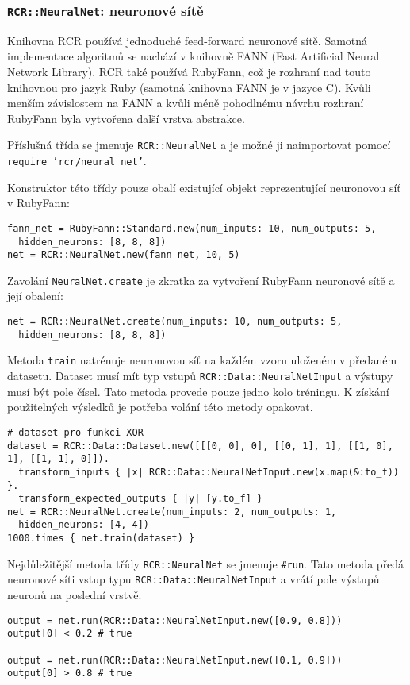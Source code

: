 \documentclass[a4paper]{article}
\begin{document}
\subsubsection{\texttt{RCR::NeuralNet}: neuronové sítě}
Knihovna RCR používá jednoduché feed-forward neuronové sítě. Samotná
implementace algoritmů se nachází v knihovně FANN (Fast Artificial Neural %
Network Library). RCR také používá RubyFann, což je rozhraní nad touto knihovnou
pro jazyk Ruby (samotná knihovna FANN je v jazyce C). Kvůli menším závislostem
na FANN a kvůli méně pohodlnému návrhu rozhraní RubyFann byla vytvořena další
vrstva abstrakce.

Příslušná třída se jmenuje \texttt{RCR::NeuralNet} a je možné ji naimportovat
pomocí \texttt{require 'rcr/neural\_net'}.

Konstruktor této třídy pouze obalí existující objekt reprezentující neuronovou
síť v RubyFann:
\begin{lstlisting}
fann_net = RubyFann::Standard.new(num_inputs: 10, num_outputs: 5,
  hidden_neurons: [8, 8, 8])
net = RCR::NeuralNet.new(fann_net, 10, 5)
\end{lstlisting}

Zavolání \texttt{NeuralNet.create} je zkratka za vytvoření RubyFann neuronové
sítě a její obalení:
\begin{lstlisting}
net = RCR::NeuralNet.create(num_inputs: 10, num_outputs: 5,
  hidden_neurons: [8, 8, 8])
\end{lstlisting}

Metoda \texttt{train} natrénuje neuronovou síť na každém vzoru uloženém
v předaném datasetu. Dataset musí mít typ vstupů \texttt{RCR::Data::NeuralNetInput} a
výstupy musí být pole čísel. Tato metoda provede pouze jedno kolo tréningu.
K získání použitelných výsledků je potřeba volání této metody opakovat.
\begin{lstlisting}
# dataset pro funkci XOR
dataset = RCR::Data::Dataset.new([[[0, 0], 0], [[0, 1], 1], [[1, 0], 1], [[1, 1], 0]]).
  transform_inputs { |x| RCR::Data::NeuralNetInput.new(x.map(&:to_f)) }.
  transform_expected_outputs { |y| [y.to_f] }
net = RCR::NeuralNet.create(num_inputs: 2, num_outputs: 1,
  hidden_neurons: [4, 4])
1000.times { net.train(dataset) }
\end{lstlisting}

Nejdůležitější metoda třídy \texttt{RCR::NeuralNet} se jmenuje \texttt{\#run}.
Tato metoda předá neuronové síti vstup typu \texttt{RCR::Data::NeuralNetInput} a
vrátí pole výstupů neuronů na poslední vrstvě.
\begin{lstlisting}
output = net.run(RCR::Data::NeuralNetInput.new([0.9, 0.8]))
output[0] < 0.2 # true

output = net.run(RCR::Data::NeuralNetInput.new([0.1, 0.9]))
output[0] > 0.8 # true
\end{lstlisting}
\end{document}
